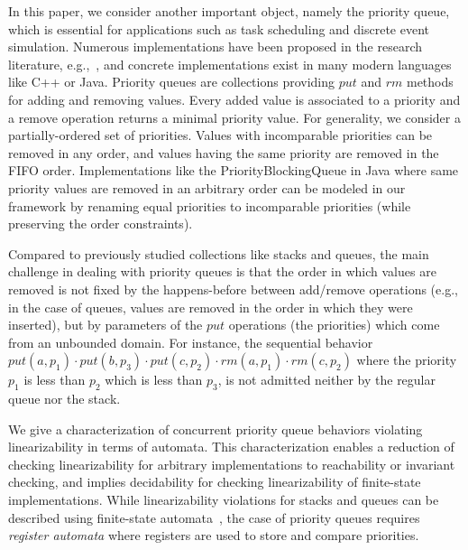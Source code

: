 In this paper, we consider another important object, namely the priority queue, which is essential for applications such as task scheduling and discrete event simulation. Numerous implementations have been proposed in the research literature, e.g.,~\cite{DBLP:conf/ppopp/AlistarhKLS15,DBLP:conf/wdag/CalciuMH14,DBLP:conf/opodis/LindenJ13,DBLP:conf/podc/ShavitZ99,DBLP:conf/ipps/ShavitL00}, and concrete implementations exist in many modern languages like C++ or Java.
%
%
Priority queues are collections providing $\textit{put}$ and $\textit{rm}$ methods for adding and removing values. Every added value is associated to a priority and a remove operation returns a minimal priority value. For generality, we consider a partially-ordered set of priorities. Values with incomparable priorities can be removed in any order, and values having the same priority are removed in the FIFO order. Implementations like the PriorityBlockingQueue in Java where same priority values are removed in an arbitrary order can be modeled in our framework by renaming equal priorities to incomparable priorities (while preserving the order constraints).

Compared to previously studied collections like stacks and queues, the main challenge in dealing with priority queues is that the order in which values are removed is not fixed by the happens-before between add/remove operations (e.g., in the case of queues, values are removed in the order in which they were inserted), but by parameters of the $\textit{put}$ operations (the priorities) which come from an unbounded domain. For instance, the sequential behavior $\textit{put}(a,p_1)\cdot \textit{put}(b,p_3)\cdot \textit{put}(c,p_2)\cdot \textit{rm}(a,p_1)\cdot \textit{rm}(c,p_2)$ where the priority $p_1$ is less than $p_2$ which is less than $p_3$, is not admitted neither by the regular queue nor the stack.



We give a characterization of concurrent priority queue behaviors violating linearizability in terms of automata. This characterization enables a reduction of checking linearizability for arbitrary implementations to reachability or invariant checking, and implies decidability for checking linearizability of finite-state implementations. While linearizability violations for stacks and queues can be described using finite-state automata~\cite{DBLP:conf/icalp/BouajjaniEEH15}, the case of priority queues requires \emph{register automata} where registers are used to store and compare priorities.


